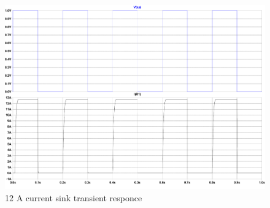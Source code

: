 \begin{figure}[h!]
    \centering
    \includegraphics[scale=0.25]{CurrentSinkTransient.pdf}
    \caption{12 A current sink transient responce}
    \label{fig:CurrentSinkTransient}
\end{figure}